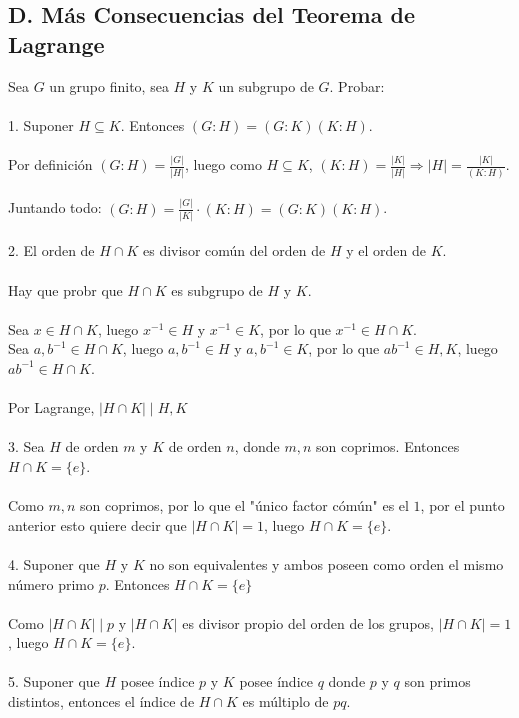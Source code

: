 \documentclass{article}
\begin{document}
\subsection*{D. Más Consecuencias del Teorema de Lagrange}
Sea $G$ un grupo finito, sea $H$ y $K$ un subgrupo de $G$. Probar:
\\
\\
1. Suponer $H \subseteq K$. Entonces $(G:H)=(G:K)(K:H)$.
\\
\\
Por definición $(G:H)=\frac{|G|}{|H|}$, luego como $H \subseteq K$, $(K:H)=\frac{|K|}{|H|} \Longrightarrow |H|=\frac{|K|}{(K:H)}$.
\\
\\
Juntando todo: $(G:H)=\frac{|G|}{|K|} \cdot (K:H)=(G:K)(K:H)$.
\\
\\
2. El orden de $H \cap K$ es divisor común del orden de $H$ y el orden de $K$.
\\
\\
Hay que probr que $H \cap K$ es subgrupo de $H$ y $K$.
\\
\\
Sea $x \in H\cap K$, luego $x^{-1} \in H$ y $x^{-1} \in K$, por lo que $x^{-1} \in H\cap K$.
\\
Sea $a,b^{-1} \in H \cap K$, luego $a,b^{-1} \in H$ y $a,b^{-1} \in K$, por lo que $ab^{-1} \in H,K$, luego $ab^{-1} \in H \cap K$.
\\
\\
Por Lagrange, $|H \cap K| \mid H,K$
\\
\\
3. Sea $H$ de orden $m$ y $K$ de orden $n$, donde $m,n$ son coprimos. Entonces $H \cap K=\{e \}$. 
\\
\\
Como $m,n$ son coprimos, por lo que el "único factor cómún" es el $1$, por el punto anterior esto quiere decir que $|H \cap K|=1$, luego $H \cap K = \{e\}$.
\\
\\
4. Suponer que $H$ y $K$ no son equivalentes y ambos poseen como orden el mismo número primo $p$. Entonces $H \cap K=\{e\}$
\\
\\
Como $|H \cap K| \mid p$ y $|H \cap K|$ es divisor propio del orden de los grupos, $|H \cap K|=1$, luego $H \cap K =\{e\}$.
\\
\\
5. Suponer que $H$ posee índice $p$ y $K$ posee índice $q$ donde $p$ y $q$ son primos distintos, entonces el índice de $H \cap K$ es múltiplo de $pq$.
\end{document}

